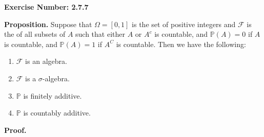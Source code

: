 \documentclass{article}
\begin{document}
\noindent \textbf{Exercise Number: 2.7.7}  %

\medskip 

\noindent \textbf{Proposition.} Suppose that $\Omega = [0,1]$ is the set of positive integers 
and $\mathcal{F}$ is the of all subsets of $A$ such that either $A$ or $A^c$ is countable, and 
$\mathbb{P}(A) = 0$ if $A$ is countable, and $\mathbb{P}(A) = 1$ if $A^C$ is countable. Then we have the following:

\begin{enumerate}[\textbf{(a)}]

\item $\mathcal{F}$ is an algebra. 

\item $\mathcal{F}$ is a $\sigma$-algebra.

\item $\mathbb{P}$ is finitely additive. 

\item $\mathbb{P}$ is countably additive. 

\end{enumerate}

\bigskip

\noindent \textbf{Proof.}  

\medskip
\end{document}

